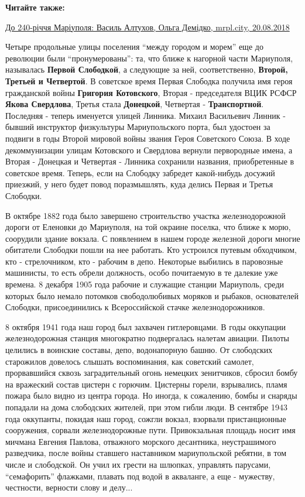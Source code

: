\textbf{Читайте также:} 

\href{https://mrpl.city/blogs/view/vasil-altuhov}{%
До 240-річчя Маріуполя: Василь Алтухов, Ольга Демідко, mrpl.city, 20.08.2018}

Четыре продольные улицы поселения \enquote{между городом и морем} еще до революции были
\enquote{пронумерованы}: та, что ближе к нагорной части Мариуполя, называлась \textbf{Первой
Слободкой}, а следующие за ней, соответственно, \textbf{Второй, Третьей и Четвертой}. В
советское время Первая Слободка получила имя героя гражданской войны \textbf{Григория
Котовского}, Вторая - председателя ВЦИК РСФСР \textbf{Якова Свердлова}, Третья стала
\textbf{Донецкой}, Четвертая - \textbf{Транспортной}. Последняя - теперь именуется улицей
Линника. Михаил Васильевич Линник - бывший инструктор физкультуры
Мариупольского порта, был удостоен за подвиги в годы Второй мировой войны
звания Героя Советского Союза. В ходе декоммунизации улицам Котовского и
Свердлова вернули первородные имена, а Вторая - Донецкая и Четвертая - Линника
сохранили названия, приобретенные в советское время. Теперь, если на Слободку
забредет какой-нибудь досужий приезжий, у него будет повод поразмышлять, куда
делись Первая и Третья Слободки.


В октябре 1882 года было завершено строительство участка железнодорожной дороги
от Еленовки до Мариуполя, на той окраине поселка, что ближе к морю, соорудили
здание вокзала. С появлением в нашем городе железной дороги многие обитатели
Слободки пошли на нее работать. Кто устроился путевым обходчиком, кто -
стрелочником, кто - рабочим в депо. Некоторые выбились в паровозные машинисты,
то есть обрели должность, особо почитаемую в те далекие уже времена. 8 декабря
1905 года рабочие и служащие станции Мариуполь, среди которых было немало
потомков свободолюбивых моряков и рыбаков, основателей Слободки, присоединились
к Всероссийской стачке железнодорожников.

8 октября 1941 года наш город был захвачен гитлеровцами. В годы оккупации
железнодорожная станция многократно подвергалась налетам авиации. Пилоты
целились в воинские составы, депо, водонапорную башню. От слободских старожилов
довелось слышать воспоминания, как советский самолет, прорвавшийся сквозь
заградительный огонь немецких зенитчиков, сбросил бомбу на вражеский состав
цистерн с горючим. Цистерны горели, взрывались, пламя пожара было видно из
центра города. Но иногда, к сожалению, бомбы и снаряды попадали на дома
слободских жителей, при этом гибли люди. В сентябре 1943 года оккупанты,
покидая наш город, сожгли вокзал, взорвали пристанционные сооружения, сорвали
железнодорожные пути. Привокзальная площадь носит имя мичмана Евгения Павлова,
отважного морского десантника, неустрашимого разведчика, после войны ставшего
наставником мариупольской ребятни, в том числе и слободской. Он учил их грести
на шлюпках, управлять парусами, \enquote{семафорить} флажками, плавать под водой в
акваланге, а еще - мужеству, честности, верности слову и делу...

